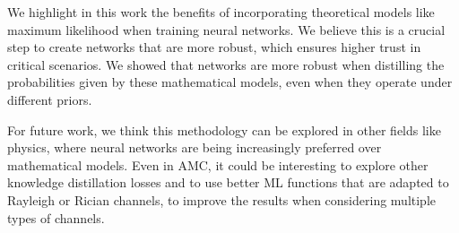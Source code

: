 \documentclass[conference]{IEEEtran}
\begin{document}
We highlight in this work the benefits of incorporating theoretical models like maximum likelihood when training neural networks. We believe this is a crucial step to create networks that are more robust, which ensures higher trust in critical scenarios. We showed that networks are more robust when distilling the probabilities given by these mathematical models, even when they operate under different priors.

For future work, we think this methodology can be explored in other fields like physics, where neural networks are being increasingly preferred over mathematical models. Even in AMC, it could be interesting to explore other knowledge distillation losses and to use better ML functions that are adapted to Rayleigh or Rician channels, to improve the results when considering multiple types of channels.




\end{document}

